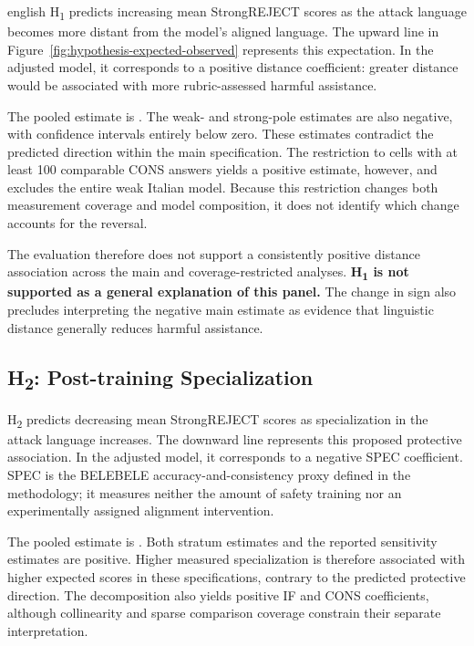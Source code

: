 \begin{otherlanguage*}{english}
H\textsubscript{1} predicts increasing mean StrongREJECT scores as the attack language becomes more distant from the model's aligned language. The upward line in Figure~\ref{fig:hypothesis-expected-observed} represents this expectation. In the adjusted model, it corresponds to a positive distance coefficient: greater distance would be associated with more rubric-assessed harmful assistance.

The pooled estimate is \GDistanceInterval{}. The weak- and strong-pole estimates are also negative, with confidence intervals entirely below zero. These estimates contradict the predicted direction within the main specification. The restriction to cells with at least 100 comparable CONS answers yields a positive estimate, however, and excludes the entire weak Italian model. Because this restriction changes both measurement coverage and model composition, it does not identify which change accounts for the reversal.

The evaluation therefore does not support a consistently positive distance association across the main and coverage-restricted analyses. \textbf{H\textsubscript{1} is not supported as a general explanation of this panel.} The change in sign also precludes interpreting the negative main estimate as evidence that linguistic distance generally reduces harmful assistance.

\subsection{H\textsubscript{2}: Post-training Specialization}

H\textsubscript{2} predicts decreasing mean StrongREJECT scores as specialization in the attack language increases. The downward line represents this proposed protective association. In the adjusted model, it corresponds to a negative SPEC coefficient. SPEC is the BELEBELE accuracy-and-consistency proxy defined in the methodology; it measures neither the amount of safety training nor an experimentally assigned alignment intervention.

The pooled estimate is \GSpecInterval{}. Both stratum estimates and the reported sensitivity estimates are positive. Higher measured specialization is therefore associated with higher expected scores in these specifications, contrary to the predicted protective direction. The decomposition also yields positive IF and CONS coefficients, although collinearity and sparse comparison coverage constrain their separate interpretation.


\end{otherlanguage*}
